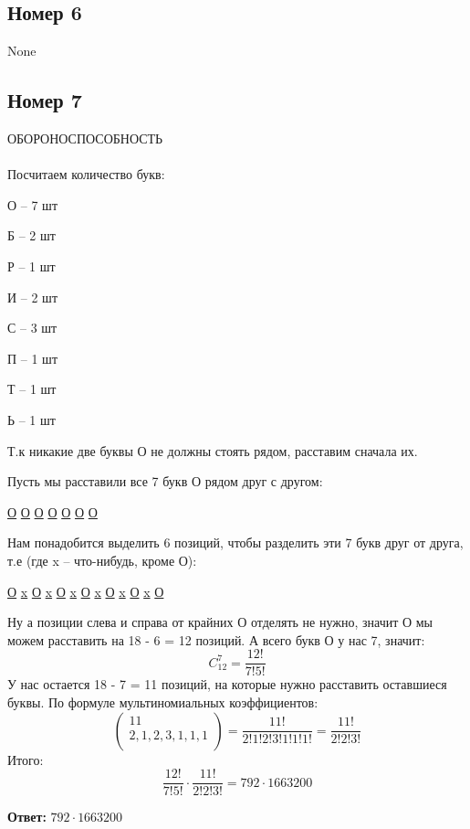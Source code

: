 \documentclass[a4paper,12pt]{article}
\begin{document}
\subsection*{Номер 6}
None

\subsection*{Номер 7}
ОБОРОНОСПОСОБНОСТЬ \\\\
Посчитаем количество букв:

О -- 7 шт

Б -- 2 шт

Р -- 1 шт

И -- 2 шт

С -- 3 шт

П -- 1 шт

Т -- 1 шт

Ь -- 1 шт 

Т.к никакие две буквы О не должны стоять рядом, расставим сначала их. 

Пусть мы расставили все 7 букв О рядом друг с другом:
\begin{center}
\underline{О} \underline{О} \underline{О} \underline{О} \underline{О} \underline{О} \underline{О} 
\end{center}
Нам понадобится выделить 6 позиций, чтобы разделить эти 7 букв друг от друга, т.е (где x -- что-нибудь, кроме О): 
\begin{center}
\underline{О} \underline{x} \underline{О} \underline{x} \underline{О} \underline{x} \underline{О} \underline{x} \underline{О} \underline{x} \underline{О} \underline{x} \underline{О}
\end{center}
Ну а позиции слева и справа от крайних О отделять не нужно, значит О мы можем расставить на 18 - 6 = 12 позиций. А всего букв О у нас 7, значит:
\[
C^7_{12} = \frac{12!}{7!5!}
\]
У нас остается 18 - 7 = 11 позиций, на которые нужно расставить оставшиеся буквы. По формуле мультиномиальных коэффициентов:
\[
\begin{pmatrix}
11 \\
2, 1, 2, 3, 1, 1, 1 \\ 
\end{pmatrix}= 
\frac{11!}{2!1!2!3!1!1!1!} = \frac{11!}{2!2!3!}
\]
Итого:
\[
\frac{12!}{7!5!}  \cdot \frac{11!}{2!2!3!} = 792 \cdot 1663200
\]
\begin{center}
\textbf{Ответ: } $ 792 \cdot 1663200 $
\end{center}
\newpage
\end{document}

